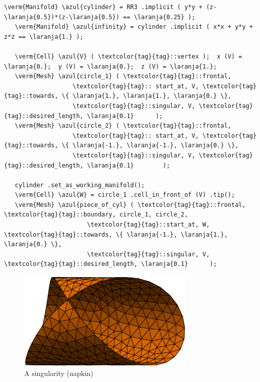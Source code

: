 \begin{Verbatim}[commandchars=\\\{\},formatcom=\small\tt,frame=single,
   label=code not working,rulecolor=\color{moldura},
   baselinestretch=0.94,framesep=2mm                                  ]
   \verm{Manifold} \azul{cylinder} = RR3 .implicit ( y*y + (z-\laranja{0.5})*(z-\laranja{0.5}) == \laranja{0.25} );
   \verm{Manifold} \azul{infinity} = cylinder .implicit ( x*x + y*y + z*z == \laranja{1.} );

   \verm{Cell} \azul{V} ( \textcolor{tag}{tag}::vertex );  x (V) = \laranja{0.};  y (V) = \laranja{0.};  z (V) = \laranja{1.};
   \verm{Mesh} \azul{circle_1} ( \textcolor{tag}{tag}::frontal,
                   \textcolor{tag}{tag}:: start_at, V, \textcolor{tag}{tag}::towards, \{ \laranja{1.}, \laranja{1.}, \laranja{0.} \},
                   \textcolor{tag}{tag}::singular, V, \textcolor{tag}{tag}::desired_length, \laranja{0.1}      );
   \verm{Mesh} \azul{circle_2} ( \textcolor{tag}{tag}::frontal,
                   \textcolor{tag}{tag}:: start_at, V, \textcolor{tag}{tag}::towards, \{ \laranja{-1.}, \laranja{-1.}, \laranja{0.} \},
                   \textcolor{tag}{tag}::singular, V, \textcolor{tag}{tag}::desired_length, \laranja{0.1}        );

   cylinder .set_as_working_manifold();
   \verm{Cell} \azul{W} = circle_1 .cell_in_front_of (V) .tip();
   \verm{Mesh} \azul{piece_of_cyl} ( \textcolor{tag}{tag}::frontal, \textcolor{tag}{tag}::boundary, circle_1, circle_2,
                       \textcolor{tag}{tag}::start_at, W, \textcolor{tag}{tag}::towards, \{ \laranja{-1.}, \laranja{1.}, \laranja{0.} \},
                       \textcolor{tag}{tag}::singular, V, \textcolor{tag}{tag}::desired_length, \laranja{0.1}      );
\end{Verbatim}

\begin{figure}[ht] \centering
 \includegraphics[width=85mm]{cyl}
  \caption{A singularity (napkin)}
  \label{\numb section 3.\numb fig 12}
\end{figure}

